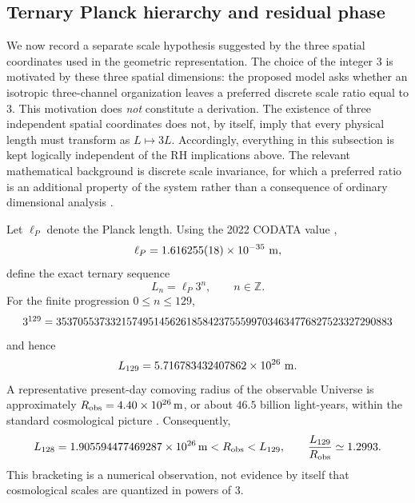 \documentclass[11pt]{amsart}
\theoremstyle{definition}
\theoremstyle{remark}
\begin{document}
\subsection{Ternary Planck hierarchy and residual phase}\label{subsec:ternary}
We now record a separate scale hypothesis suggested by the three spatial coordinates used in the
geometric representation.  The choice of the integer $3$ is motivated by these three spatial
dimensions: the proposed model asks whether an isotropic three-channel organization leaves a
preferred discrete scale ratio equal to $3$.  This motivation does \emph{not} constitute a
derivation.  The existence of three independent spatial coordinates does not, by itself, imply
that every physical length must transform as $L\mapsto3L$.  Accordingly, everything in this
subsection is kept logically independent of the RH implications above.  The relevant mathematical
background is discrete scale invariance, for which a preferred ratio is an additional property of
the system rather than a consequence of ordinary dimensional analysis
\cite{SornetteDSI,Calcagni2017}.

Let $\ell_P$ denote the Planck length.  Using the 2022 CODATA value
\cite{CODATA2022},
\begin{equation}\label{eq:planck-length}
  \ell_P=1.616255(18)\times10^{-35}\ {\rm m},
\end{equation}
define the exact ternary sequence
\begin{equation}\label{eq:ternary-sequence}
  L_n=\ell_P3^n,\qquad n\in\mathbb Z.
\end{equation}
For the finite progression $0\le n\le129$,
\begin{equation}
  \resizebox{0.96\linewidth}{!}{$
  3^{129}=35370553733215749514562618584237555997034634776827523327290883$}
\end{equation}
and hence
\begin{equation}\label{eq:L129}
  L_{129}=5.716783432407862\times10^{26}\ {\rm m}.
\end{equation}
A representative present-day comoving radius of the observable Universe is approximately
$R_{\rm obs}=4.40\times10^{26}\,{\rm m}$, or about $46.5$ billion light-years, within the
standard cosmological picture \cite{Planck2018,NASACosmicTimes}.  Consequently,
\begin{equation}
  L_{128}=1.905594477469287\times10^{26}\,{\rm m}
  <R_{\rm obs}<L_{129},\qquad
  \frac{L_{129}}{R_{\rm obs}}\simeq1.2993.
\end{equation}
This bracketing is a numerical observation, not evidence by itself that cosmological scales are
quantized in powers of $3$.
\end{document}
